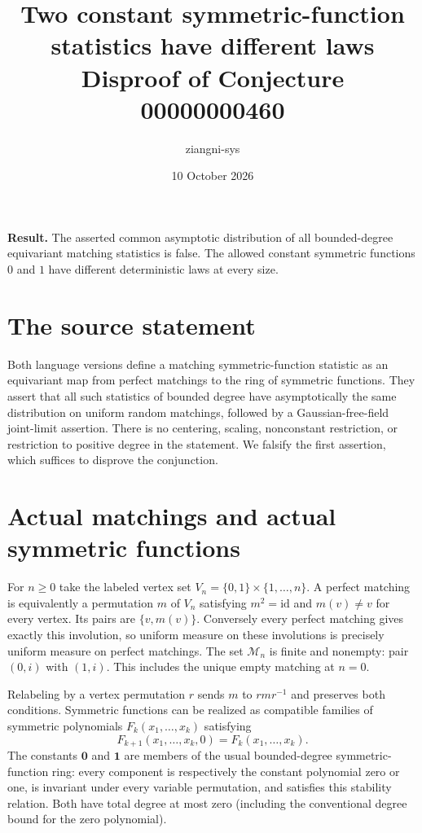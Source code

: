 \documentclass[11pt]{article}
\title{Two constant symmetric-function statistics have different laws\\\large Disproof of Conjecture 00000000460}
\author{ziangni-sys}\date{10 October 2026}
\begin{document}
\maketitle
\noindent\textbf{Result.} The asserted common asymptotic distribution of all bounded-degree equivariant matching statistics is false. The allowed constant symmetric functions $0$ and $1$ have different deterministic laws at every size.

\section*{The source statement}
Both language versions define a matching symmetric-function statistic as an equivariant map from perfect matchings to the ring of symmetric functions. They assert that all such statistics of bounded degree have asymptotically the same distribution on uniform random matchings, followed by a Gaussian-free-field joint-limit assertion. There is no centering, scaling, nonconstant restriction, or restriction to positive degree in the statement. We falsify the first assertion, which suffices to disprove the conjunction.

\section*{Actual matchings and actual symmetric functions}
For $n\ge0$ take the labeled vertex set $V_n=\{0,1\}\times\{1,\ldots,n\}$. A perfect matching is equivalently a permutation $m$ of $V_n$ satisfying $m^2=\mathrm{id}$ and $m(v)\ne v$ for every vertex. Its pairs are $\{v,m(v)\}$. Conversely every perfect matching gives exactly this involution, so uniform measure on these involutions is precisely uniform measure on perfect matchings. The set $\mathcal M_n$ is finite and nonempty: pair $(0,i)$ with $(1,i)$. This includes the unique empty matching at $n=0$.

Relabeling by a vertex permutation $r$ sends $m$ to $rmr^{-1}$ and preserves both conditions. Symmetric functions can be realized as compatible families of symmetric polynomials $F_k(x_1,\ldots,x_k)$ satisfying
\[
 F_{k+1}(x_1,\ldots,x_k,0)=F_k(x_1,\ldots,x_k).
\]
The constants $\mathbf0$ and $\mathbf1$ are members of the usual bounded-degree symmetric-function ring: every component is respectively the constant polynomial zero or one, is invariant under every variable permutation, and satisfies this stability relation. Both have total degree at most zero (including the conventional degree bound for the zero polynomial).
\end{document}
